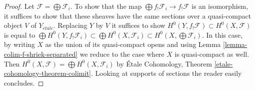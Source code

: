 \documentclass{stacks-project}
\theoremstyle{plain}
\theoremstyle{definition}
\theoremstyle{remark}
\numberwithin{equation}{subsection}
\def\etale{{\acute{e}tale}}
\begin{document}
\begin{proof}
Let $\mathcal{F} = \bigoplus \mathcal{F}_i$. To show that the map
$\bigoplus f_!\mathcal{F}_i \to f_!\mathcal{F}$ is an isomorphism,
it suffices to show that these sheaves have the same sections over
a quasi-compact object $V$ of $Y_\etale$. Replacing $Y$ by $V$
it suffices to show
$H^0(Y, f_!\mathcal{F}) \subset H^0(X, \mathcal{F})$
is equal to
$\bigoplus H^0(Y, f_!\mathcal{F}_i)
\subset \bigoplus H^0(X, \mathcal{F}_i)
\subset H^0(X, \bigoplus \mathcal{F}_i)$.
In this case, by writing $X$ as the union of its quasi-compact opens
and using Lemma \ref{lemma-colim-f-shriek-separated}
we reduce to the case where $X$ is quasi-compact as well.
Then $H^0(X, \mathcal{F}) = \bigoplus H^0(X, \mathcal{F}_i)$
by \'Etale Cohomology, Theorem \ref{etale-cohomology-theorem-colimit}.
Looking at supports of sections the reader easily concludes.
\end{proof}
\end{document}
